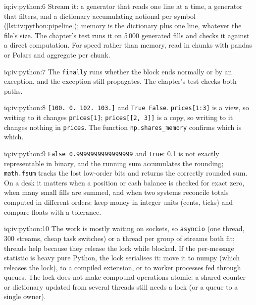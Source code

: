 \begin{solution}{iq:iv:python:6}
Stream it: a generator that reads one line at a time, a generator that filters, and a dictionary accumulating notional per symbol
(\cref{lst:iv:python:pipeline}); memory is the dictionary plus one line, whatever the file's size. The chapter's test runs it on
5\,000 generated fills and checks it against a direct computation. For speed rather than memory, read in chunks with pandas or
Polars and aggregate per chunk.
\end{solution}

\begin{solution}{iq:iv:python:7}
\label{lst:iv:python:limit}
The \texttt{finally} runs whether the block ends normally or by an exception, and the exception still propagates. The chapter's test
checks both paths.
\end{solution}

\begin{solution}{iq:iv:python:8}
\texttt{[100. 0. 102. 103.]} and \texttt{True False}. \texttt{prices[1:3]} is a view, so writing to it changes \texttt{prices[1]};
\texttt{prices[[2, 3]]} is a copy, so writing to it changes nothing in \texttt{prices}. The function
\texttt{np.shares\_memory} confirms which is which.
\end{solution}

\begin{solution}{iq:iv:python:9}
\texttt{False 0.9999999999999999} and \texttt{True}: 0.1 is not exactly representable in binary, and the running sum accumulates the
rounding; \texttt{math.fsum} tracks the lost low-order bits and returns the correctly rounded sum. On a desk it matters when a
position or cash balance is checked for exact zero, when many small fills are summed, and when two systems reconcile totals computed
in different orders: keep money in integer units (cents, ticks) and compare floats with a tolerance.
\end{solution}

\begin{solution}{iq:iv:python:10}
The work is mostly waiting on sockets, so \texttt{asyncio} (one thread, 300 streams, cheap task switches) or a thread per group of
streams both fit; threads help because they release the lock while blocked. If the per-message statistic is heavy pure Python,
the lock serialises it: move it to numpy (which releases the lock), to a compiled extension, or to worker processes fed through
queues. The lock does not make compound operations atomic: a shared counter or dictionary updated from several threads still needs a
lock (or a queue to a single owner).
\end{solution}


